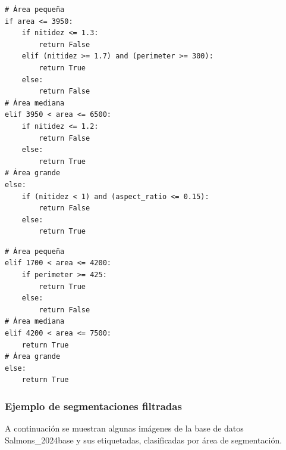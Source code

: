 \begin{listing}[htbp]
\caption[Criterio de filtrado usado en SalmonesV2]{\textit{Snippet} con el criterio de filtrado utilizado en la versión SalmonesV2.}
\label{lst:snippet_filter_salmones_v2}
\begin{verbatim}
# Área pequeña
if area <= 3950:
    if nitidez <= 1.3:
        return False
    elif (nitidez >= 1.7) and (perimeter >= 300):
        return True
    else:
        return False
# Área mediana
elif 3950 < area <= 6500:   
    if nitidez <= 1.2:
        return False
    else:
        return True
# Área grande
else:
    if (nitidez < 1) and (aspect_ratio <= 0.15):
        return False
    else:
        return True
\end{verbatim}
\end{listing}

\begin{listing}[htbp]
\caption[Criterio de filtrado usado en SalmonesV3 y SalmonesV4]{\textit{Snippet} con el criterio de filtrado utilizado en las versiones SalmonesV3 y SalmonesV4.} 
\label{lst:snippet_filter_salmones_v3_v4}
\begin{verbatim}
# Área pequeña
elif 1700 < area <= 4200:
    if perimeter >= 425:
        return True
    else:
        return False
# Área mediana
elif 4200 < area <= 7500:
    return True
# Área grande
else:
    return True
\end{verbatim}
\end{listing}

\subsubsection{Ejemplo de segmentaciones filtradas}
A continuación se muestran algunas imágenes de la base de datos Salmons_2024base y sus etiquetadas, clasificadas por área de segmentación.

